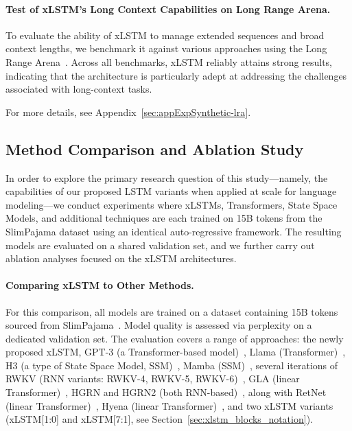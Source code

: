 \paragraph{Test of xLSTM's Long Context Capabilities on Long Range Arena.} To evaluate the ability of xLSTM to manage extended sequences and broad context lengths, we benchmark it against various approaches using the Long Range Arena~\citep{Tay:21}. Across all benchmarks, xLSTM reliably attains strong results, indicating that the architecture is particularly adept at addressing the challenges associated with long-context tasks.

For more details, see Appendix~\ref{sec:appExpSynthetic-lra}.

\subsection{Method Comparison and Ablation Study}
\label{sec:ExpComparison}

In order to explore the primary research question of this study—namely, the capabilities of our proposed LSTM variants when applied at scale for language modeling—we conduct experiments where xLSTMs, Transformers, State Space Models, and additional techniques are each trained on 15B tokens from the SlimPajama dataset using an identical auto-regressive framework. The resulting models are evaluated on a shared validation set, and we further carry out ablation analyses focused on the xLSTM architectures.

\paragraph{Comparing xLSTM to Other Methods.} For this comparison, all models are trained on a dataset containing 15B tokens sourced from SlimPajama~\citep{Soboleva:23}. Model quality is assessed via perplexity on a dedicated validation set. The evaluation covers a range of approaches: the newly proposed xLSTM, GPT-3 (a Transformer-based model)~\citep{Brown:20short}, Llama (Transformer)~\citep{Touvron:23arxiv}, H3 (a type of State Space Model, SSM)~\citep{Fu:23}, Mamba (SSM)~\citep{Gu:24arxiv}, several iterations of RWKV (RNN variants: RWKV-4, RWKV-5, RWKV-6)~\citep{Peng:23arxivshort,Peng:24arxivshort}, GLA (linear Transformer)~\citep{Yang:23arxiv}, HGRN and HGRN2 (both RNN-based)~\citep{Qin:23,Qin:24arxiv}, along with RetNet (linear Transformer)~\citep{Sun:23arxiv}, Hyena (linear Transformer)~\citep{Poli:23}, and two xLSTM variants (xLSTM[1:0] and xLSTM[7:1], see Section~\ref{sec:xlstm_blocks_notation}). 

